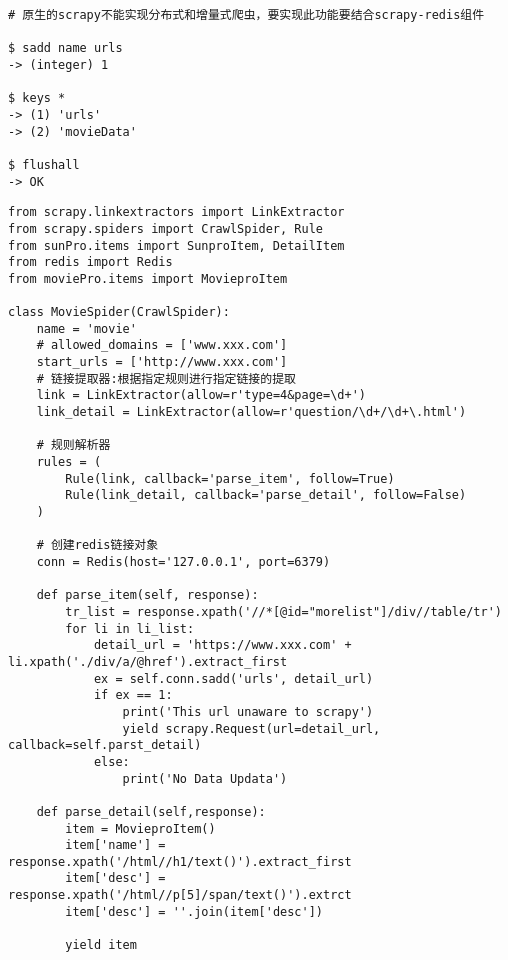 \documentclass[a4paper,11pt]{ctexart}    %
\begin{document}
\begin{tcolorbox}[
         colback=red!5!white,
         colframe=teal,
         title=\textbf{Redis Database order}
    ]
\begin{verbatim}
# 原生的scrapy不能实现分布式和增量式爬虫，要实现此功能要结合scrapy-redis组件

$ sadd name urls
-> (integer) 1

$ keys *
-> (1) 'urls'
-> (2) 'movieData'

$ flushall
-> OK
\end{verbatim}
\end{tcolorbox}

\begin{tcolorbox}[
         colback=red!5!white,
         colframe=teal,
         title=\textbf{main.py}
    ]
\begin{verbatim}
from scrapy.linkextractors import LinkExtractor
from scrapy.spiders import CrawlSpider, Rule
from sunPro.items import SunproItem, DetailItem
from redis import Redis
from moviePro.items import MovieproItem

class MovieSpider(CrawlSpider):
    name = 'movie'
    # allowed_domains = ['www.xxx.com']
    start_urls = ['http://www.xxx.com']
    # 链接提取器:根据指定规则进行指定链接的提取
    link = LinkExtractor(allow=r'type=4&page=\d+')
    link_detail = LinkExtractor(allow=r'question/\d+/\d+\.html')

    # 规则解析器
    rules = (
        Rule(link, callback='parse_item', follow=True)
        Rule(link_detail, callback='parse_detail', follow=False)
    )

    # 创建redis链接对象
    conn = Redis(host='127.0.0.1', port=6379)

    def parse_item(self, response):
        tr_list = response.xpath('//*[@id="morelist"]/div//table/tr')
        for li in li_list:
            detail_url = 'https://www.xxx.com' + li.xpath('./div/a/@href').extract_first
            ex = self.conn.sadd('urls', detail_url)
            if ex == 1:
                print('This url unaware to scrapy')
                yield scrapy.Request(url=detail_url, callback=self.parst_detail)
            else:
                print('No Data Updata')

    def parse_detail(self,response):
        item = MovieproItem()
        item['name'] = response.xpath('/html//h1/text()').extract_first
        item['desc'] = response.xpath('/html//p[5]/span/text()').extrct
        item['desc'] = ''.join(item['desc'])

        yield item
\end{verbatim}
\end{tcolorbox}
\end{document}
